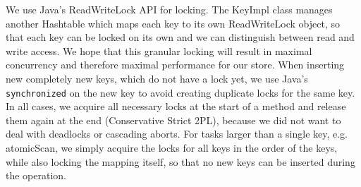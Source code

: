\documentclass[12pt,a4paper]{article}
\begin{document}
We use Java's ReadWriteLock API for locking. The KeyImpl class manages another Hashtable which maps each key to its own ReadWriteLock object, so that each key can be locked on its own and we can distinguish between read and write access. We hope that this granular locking will result in maximal concurrency and therefore maximal performance for our store. When inserting new completely new keys, which do not have a lock yet, we use Java's \texttt{synchronized} on the new key to avoid creating duplicate locks for the same key. In all cases, we acquire all necessary locks at the start of a method and release them again at the end (Conservative Strict 2PL), because we did not want to deal with deadlocks or cascading aborts. For tasks larger than a single key, e.g. atomicScan, we simply acquire the locks for all keys in the order of the keys, while also locking the mapping itself, so that no new keys can be inserted during the operation.
\end{document}
